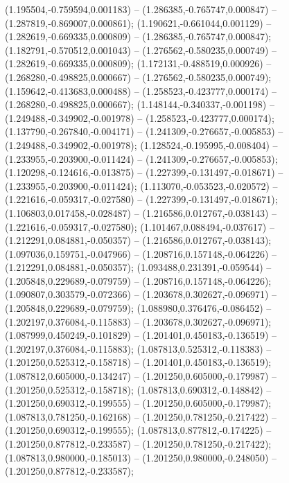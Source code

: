  (1.195504,-0.759594,0.001183) -- (1.286385,-0.765747,0.000847) -- (1.287819,-0.869007,0.000861);
 (1.190621,-0.661044,0.001129) -- (1.282619,-0.669335,0.000809) -- (1.286385,-0.765747,0.000847);
 (1.182791,-0.570512,0.001043) -- (1.276562,-0.580235,0.000749) -- (1.282619,-0.669335,0.000809);
 (1.172131,-0.488519,0.000926) -- (1.268280,-0.498825,0.000667) -- (1.276562,-0.580235,0.000749);
 (1.159642,-0.413683,0.000488) -- (1.258523,-0.423777,0.000174) -- (1.268280,-0.498825,0.000667);
 (1.148144,-0.340337,-0.001198) -- (1.249488,-0.349902,-0.001978) -- (1.258523,-0.423777,0.000174);
 (1.137790,-0.267840,-0.004171) -- (1.241309,-0.276657,-0.005853) -- (1.249488,-0.349902,-0.001978);
 (1.128524,-0.195995,-0.008404) -- (1.233955,-0.203900,-0.011424) -- (1.241309,-0.276657,-0.005853);
 (1.120298,-0.124616,-0.013875) -- (1.227399,-0.131497,-0.018671) -- (1.233955,-0.203900,-0.011424);
 (1.113070,-0.053523,-0.020572) -- (1.221616,-0.059317,-0.027580) -- (1.227399,-0.131497,-0.018671);
 (1.106803,0.017458,-0.028487) -- (1.216586,0.012767,-0.038143) -- (1.221616,-0.059317,-0.027580);
 (1.101467,0.088494,-0.037617) -- (1.212291,0.084881,-0.050357) -- (1.216586,0.012767,-0.038143);
 (1.097036,0.159751,-0.047966) -- (1.208716,0.157148,-0.064226) -- (1.212291,0.084881,-0.050357);
 (1.093488,0.231391,-0.059544) -- (1.205848,0.229689,-0.079759) -- (1.208716,0.157148,-0.064226);
 (1.090807,0.303579,-0.072366) -- (1.203678,0.302627,-0.096971) -- (1.205848,0.229689,-0.079759);
 (1.088980,0.376476,-0.086452) -- (1.202197,0.376084,-0.115883) -- (1.203678,0.302627,-0.096971);
 (1.087999,0.450249,-0.101829) -- (1.201401,0.450183,-0.136519) -- (1.202197,0.376084,-0.115883);
 (1.087813,0.525312,-0.118383) -- (1.201250,0.525312,-0.158718) -- (1.201401,0.450183,-0.136519);
 (1.087812,0.605000,-0.134247) -- (1.201250,0.605000,-0.179987) -- (1.201250,0.525312,-0.158718);
 (1.087813,0.690312,-0.148842) -- (1.201250,0.690312,-0.199555) -- (1.201250,0.605000,-0.179987);
 (1.087813,0.781250,-0.162168) -- (1.201250,0.781250,-0.217422) -- (1.201250,0.690312,-0.199555);
 (1.087813,0.877812,-0.174225) -- (1.201250,0.877812,-0.233587) -- (1.201250,0.781250,-0.217422);
 (1.087813,0.980000,-0.185013) -- (1.201250,0.980000,-0.248050) -- (1.201250,0.877812,-0.233587);
